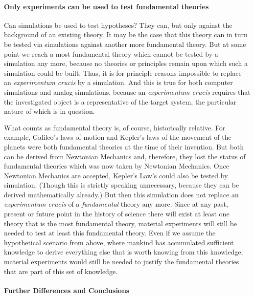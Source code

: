 \documentclass[12pt, a4paper]{article}
\numberwithin{equation}{section}
\begin{document}
\paragraph{Only experiments can be used to test fundamental theories}

Can simulations be used to test hypotheses? They can, but only against the background of an existing theory. It may be the case that this theory can in turn be tested via simulations against another more fundamental theory. But at some point we reach a most fundamental theory which cannot be tested by a simulation any more, because no theories or principles remain upon which such a simulation could be built. Thus, it is for principle reasons impossible to replace an {\em experimentum crucis} by a simulation. And this is true for both computer simulations and analog simulations, because an {\em experimentum crucis} requires that the investigated object is a representative of the target system, the particular nature of which is in question.

What counts as fundamental theory is, of course, historically relative. For example, Galileo's laws of motion and Kepler's laws of the movement of the planets were both fundamental theories at the time of their invention. But both can be derived from Newtonian Mechanics and, therefore, they lost the status of fundamental theories which was now taken by Newtonian Mechanics. Once Newtonian Mechanics are accepted, Kepler's Law's could also be tested by simulation. (Though this is strictly speaking unnecessary, because they can be derived mathematically already.) But then this simulation does not replace an {\em experimentum crucis} of a {\em fundamental} theory any more. Since at any past, present or future point in the history of science there will exist at least one theory that is the most fundamental theory, material experiments will still be needed to test at least this fundamental theory. Even if we assume the hypothetical scenario from above, where mankind has accumulated sufficient knowledge to derive everything else that is worth knowing from this knowledge, material experiments would still be needed to justify the fundamental theories that are part of this set of knowledge.

\paragraph{Further Differences and Conclusions}
\end{document}
